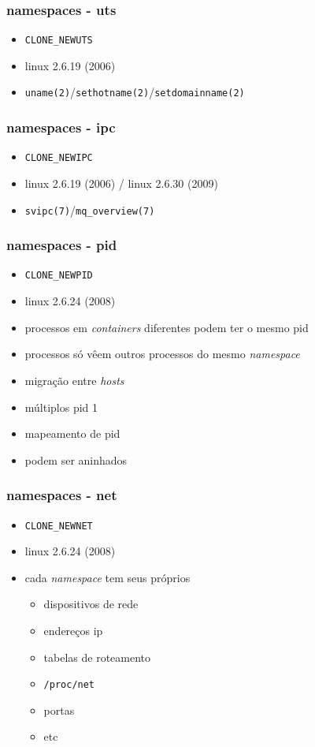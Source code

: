 \documentclass{beamer}
\begin{document}
\begin{frame}
    \frametitle{namespaces - uts}
    \begin{itemize}
        \item \texttt{CLONE\_NEWUTS}
        \item linux 2.6.19 (2006)
        \item \texttt{uname(2)}/\texttt{sethotname(2)}/\texttt{setdomainname(2)}
    \end{itemize}
\end{frame}

\begin{frame}
    \frametitle{namespaces - ipc}
    \begin{itemize}
        \item \texttt{CLONE\_NEWIPC}
        \item linux 2.6.19 (2006) / linux 2.6.30 (2009)
        \item \texttt{svipc(7)}/\texttt{mq\_overview(7)}
    \end{itemize}
\end{frame}

\begin{frame}
    \frametitle{namespaces - pid}
    \begin{itemize}
        \item \texttt{CLONE\_NEWPID}
        \item linux 2.6.24 (2008)
        \item processos em \textit{containers} diferentes podem ter o mesmo pid
        \item processos só vêem outros processos do mesmo \textit{namespace}
        \item migração entre \textit{hosts}
        \item múltiplos pid 1
        \item mapeamento de pid
        \item podem ser aninhados
    \end{itemize}
\end{frame}

\begin{frame}
    \frametitle{namespaces - net}
    \begin{itemize}
        \item \texttt{CLONE\_NEWNET}
        \item linux 2.6.24 (2008)
        \item cada \textit{namespace} tem seus próprios
            \begin{itemize}
                \item dispositivos de rede
                \item endereços ip
                \item tabelas de roteamento
                \item \texttt{/proc/net}
                \item portas
                \item etc
            \end{itemize}
    \end{itemize}
\end{frame}
\end{document}
